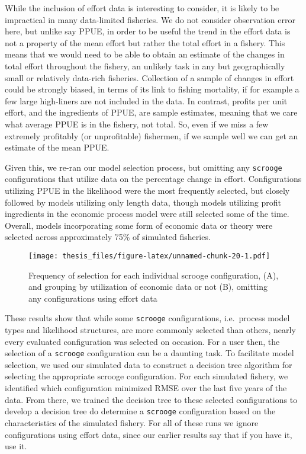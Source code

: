 \documentclass[twoside,12pt,final]{ucthesis-CA2012}
\begin{document}
\begin{ucmainmatter}
While the inclusion of effort data is interesting to consider, it is
likely to be impractical in many data-limited fisheries. We do not
consider observation error here, but unlike say PPUE, in order to be
useful the trend in the effort data is not a property of the mean effort
but rather the total effort in a fishery. This means that we would need
to be able to obtain an estimate of the changes in total effort
throughout the fishery, an unlikely task in any but geographically small
or relatively data-rich fisheries. Collection of a sample of changes in
effort could be strongly biased, in terms of its link to fishing
mortality, if for example a few large high-liners are not included in
the data. In contrast, profits per unit effort, and the ingredients of
PPUE, are sample estimates, meaning that we care what average PPUE is in
the fishery, not total. So, even if we miss a few extremely profitably
(or unprofitable) fishermen, if we sample well we can get an estimate of
the mean PPUE.

Given this, we re-ran our model selection process, but omitting any
\texttt{scrooge} configurations that utilize data on the percentage
change in effort. Configurations utilizing PPUE in the likelihood were
the most frequently selected, but closely followed by models utilizing
only length data, though models utilizing profit ingredients in the
economic process model were still selected some of the time. Overall,
models incorporating some form of economic data or theory were selected
across approximately 75\% of simulated fisheries.
\begin{figure}
\centering
\texttt{[image: thesis\_files/figure-latex/unnamed-chunk-20-1.pdf]}
\caption{\label{fig:unnamed-chunk-20}Frequency of selection for each
individual scrooge configuration, (A), and grouping by utilization of
economic data or not (B), omitting any configurations using effort data}
\end{figure}
These results show that while some \texttt{scrooge} configurations,
i.e.~process model types and likelihood structures, are more commonly
selected than others, nearly every evaluated configuration was selected
on occasion. For a user then, the selection of a \texttt{scrooge}
configuration can be a daunting task. To facilitate model selection, we
used our simulated data to construct a decision tree algorithm for
selecting the appropriate scrooge configuration. For each simulated
fishery, we identified which configuration minimized RMSE over the last
five years of the data. From there, we trained the decision tree to
these selected configurations to develop a decision tree do determine a
\texttt{scrooge} configuration based on the characteristics of the
simulated fishery. For all of these runs we ignore configurations using
effort data, since our earlier results say that if you have it, use it.


\end{ucmainmatter}
\end{document}
